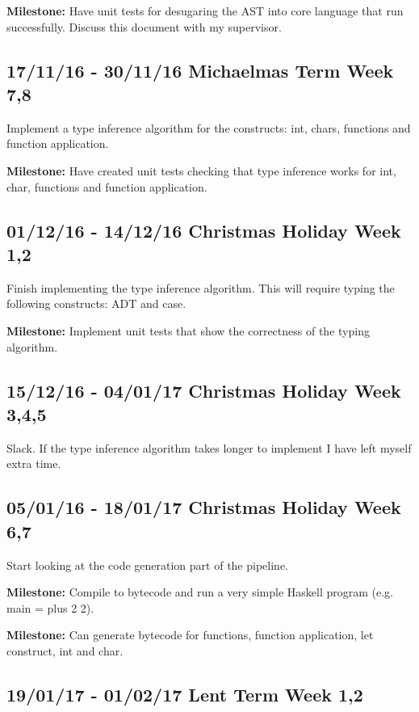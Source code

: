\documentclass[12pt,a4paper,twoside]{article}
\begin{document}
      \textbf{Milestone:} Have unit tests for desugaring the AST into core language that run successfully.
      Discuss this document with my supervisor.


    \subsection*{17/11/16 - 30/11/16 \hfill Michaelmas Term  Week 7,8}

      Implement a type inference algorithm for the constructs: int, chars, functions and function application.

      \textbf{Milestone:} Have created unit tests checking that type inference works for int, char, functions and function application.

    \subsection*{01/12/16 - 14/12/16 \hfill Christmas Holiday Week 1,2}

    Finish implementing the type inference algorithm. This will require typing the following constructs: ADT and case.

    \textbf{Milestone:} Implement unit tests that show the correctness of the typing algorithm.

    \subsection*{15/12/16 - 04/01/17 \hfill Christmas Holiday Week  3,4,5}

    Slack. If the type inference algorithm takes longer to implement I have left myself extra time.

    \subsection*{05/01/16 - 18/01/17 \hfill Christmas Holiday Week 6,7}

    Start looking at the code generation part of the pipeline.

    \textbf{Milestone:} Compile to bytecode and run a very simple Haskell program (e.g. main = plus 2 2).

    \textbf{Milestone:} Can generate bytecode for functions, function application, let construct, int and char.

    \subsection*{19/01/17 - 01/02/17 \hfill Lent Term Week 1,2}
\end{document}
